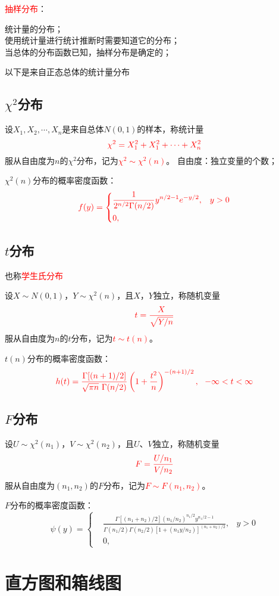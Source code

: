 \documentclass[12pt,a4paper]{article}
\begin{document}
\textcolor{red}{抽样分布}：

统计量的分布；\\
使用统计量进行统计推断时需要知道它的分布；\\
当总体的分布函数已知，抽样分布是确定的；

以下是来自正态总体的统计量分布 \\
\subsection{$\chi^2$分布}

设$X_1, X_2, \cdots, X_n$是来自总体$N(0,1)$的样本，称统计量
\begin{equation}
\color{red} \chi^2 = X_1^2 + X_1^2 +\cdots + X_n^2 
\end{equation}
服从自由度为$n$的$\chi^2$分布，记为\textcolor{red}{$\chi^2 \sim \chi^2(n)$}。
自由度：独立变量的个数；

$\chi^2(n)$分布的概率密度函数：
\begin{equation}
\color{red} f(y) = \left\{
\begin{aligned}
&\frac{1}{2^{n/2} \Gamma(n/2)} y^{n/2-1} e^{-y/2},& y> 0 \\
&0,& 
\end{aligned}
\right.
\end{equation}



\subsection{$t$分布}
也称\textcolor{red}{学生氏分布}

设$X \sim N(0,1)$，$Y\sim \chi^2(n)$，且$X$，$Y$独立，称随机变量
\begin{equation}
\color{red} t = \frac{X}{\sqrt{Y/n}}
\end{equation}
服从自由度为$n$的$t$分布，记为\textcolor{red}{$t \sim t(n)$}。

$t(n)$分布的概率密度函数：
\begin{equation}
\color{red} h(t) = \frac{\Gamma[(n+1)/2]}{\sqrt{\pi n}~\Gamma(n/2)} \left(1+ \frac{t^2}{n} \right)^{-(n+1)/2}, ~~ -\infty < t < \infty
\end{equation}

\subsection{$F$分布}

设$U\sim \chi^2(n_1)$，$V\sim \chi^2(n_2)$，且$U$、$V$独立，称随机变量
\begin{equation}
\color{red} F = \frac{U/n_1}{V/n_2}
\end{equation}
服从自由度为$(n_1,n_2)$的$F$分布，记为\textcolor{red}{$F \sim F(n_1,n_2)$}。

$F$分布的概率密度函数：
\begin{equation}
\psi(y) = \left\{
\begin{aligned}
&\frac{\Gamma[(n_1 +n_2)/2] (n_1/n_2)^{n_1/2} y^{n_1/2-1}}{\Gamma(n_1/2) \Gamma(n_2/2) [1+(n_1y/n_2)]^{(n_1+n_2)/2}},& y> 0 \\
&0,& 
\end{aligned}
\right.
\end{equation}

\section{直方图和箱线图}
\end{document}
